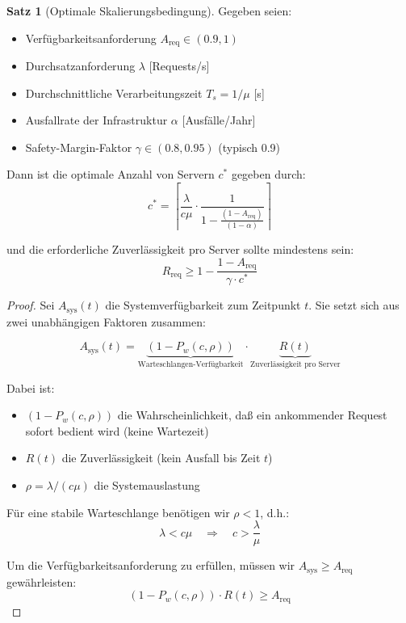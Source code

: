 \documentclass[a4paper,11pt]{article}
\theoremstyle{definition}
\newtheorem{satz}{Satz}
\newenvironment{beweis}{\begin{proof}}{\end{proof}}
\begin{document}
\begin{satz}[Optimale Skalierungsbedingung]
    \label{satz:optimal_scaling}
    Gegeben seien:
    \begin{itemize}
        \item Verfügbarkeitsanforderung $A_{\text{req}} \in (0.9, 1)$
        \item Durchsatzanforderung $\lambda$ [Requests/s]
        \item Durchschnittliche Verarbeitungszeit $T_s = 1/\mu$ [s]
        \item Ausfallrate der Infrastruktur $\alpha$ [Ausfälle/Jahr]
        \item Safety-Margin-Faktor $\gamma \in (0.8, 0.95)$ (typisch 0.9)
    \end{itemize}

    Dann ist die optimale Anzahl von Servern $c^*$ gegeben durch:
    \[
        c^* = \left\lceil \frac{\lambda}{c\mu} \cdot \frac{1}{1 - \frac{(1-A_{\text{req}})}{(1-\alpha)}} \right\rceil
    \]

    und die erforderliche Zuverlässigkeit pro Server sollte mindestens sein:
    \[
        R_{\text{req}} \geq 1 - \frac{1 - A_{\text{req}}}{\gamma \cdot c^*}
    \]

    \begin{beweis}
        Sei $A_{\text{sys}}(t)$ die Systemverfügbarkeit zum Zeitpunkt $t$. Sie setzt sich aus 
        zwei unabhängigen Faktoren zusammen:

        \[
            A_{\text{sys}}(t) = \underbrace{(1 - P_w(c, \rho))}_{\text{Warteschlangen-Verfügbarkeit}} 
                                \cdot \underbrace{R(t)}_{\text{Zuverlässigkeit pro Server}}
        \]

        Dabei ist:
        \begin{itemize}
            \item $(1 - P_w(c, \rho))$ die Wahrscheinlichkeit, daß ein ankommender Request 
                  sofort bedient wird (keine Wartezeit)
            \item $R(t)$ die Zuverlässigkeit (kein Ausfall bis Zeit $t$)
            \item $\rho = \lambda/(c\mu)$ die Systemauslastung
        \end{itemize}

        Für eine stabile Warteschlange benötigen wir $\rho < 1$, d.h.:
        \[
            \lambda < c\mu \quad \Rightarrow \quad c > \frac{\lambda}{\mu}
        \]

        Um die Verfügbarkeitsanforderung zu erfüllen, müssen wir $A_{\text{sys}} \geq A_{\text{req}}$ 
        gewährleisten:
        \[
            (1 - P_w(c, \rho)) \cdot R(t) \geq A_{\text{req}}
        \]


\end{beweis}
\end{satz}
\end{document}
